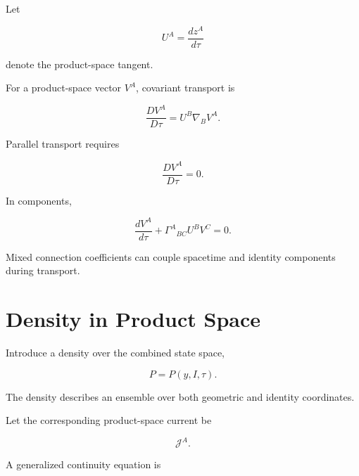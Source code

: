 \documentclass[12pt,oneside]{book}
\begin{document}
Let

\begin{equation}
    U^A
    =
    \frac{dz^A}{d\tau}
\end{equation}

denote the product-space tangent.

For a product-space vector \(V^A\), covariant transport is

\begin{equation}
    \frac{D V^A}{D\tau}
    =
    U^B
    \nabla_B V^A.
    \label{eq:product-space-vector-transport}
\end{equation}

Parallel transport requires

\begin{equation}
    \frac{D V^A}{D\tau}
    =
    0.
    \label{eq:product-parallel-transport}
\end{equation}

In components,

\begin{equation}
    \frac{dV^A}{d\tau}
    +
    \Gamma^A{}_{BC}
    U^B V^C
    =
    0.
    \label{eq:product-parallel-transport-expanded}
\end{equation}

Mixed connection coefficients can couple spacetime and identity
components during transport.


\section{Density in Product Space}
\label{sec:product-space-density}

Introduce a density over the combined state space,

\begin{equation}
    P
    =
    P(y,I,\tau).
    \label{eq:product-space-density}
\end{equation}

The density describes an ensemble over both geometric and
identity coordinates.

Let the corresponding product-space current be

\begin{equation}
    \mathcal{J}^A.
\end{equation}

A generalized continuity equation is
\end{document}
